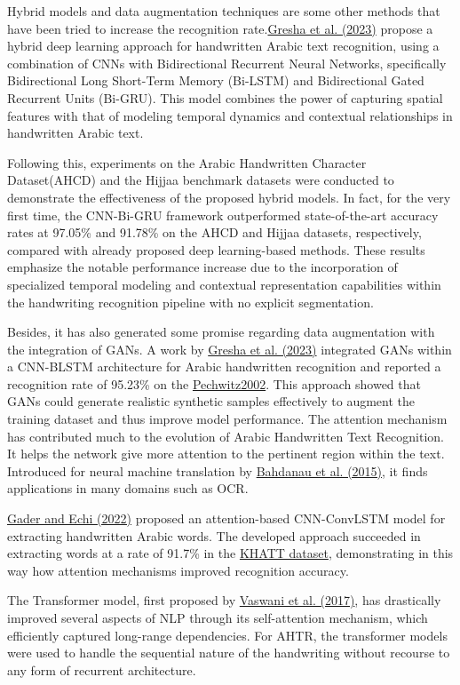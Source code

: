 Hybrid models and data augmentation techniques are some other methods that have been tried to increase the recognition rate.\hyperref[Gresha2023]{Gresha et al. (2023)} propose a hybrid deep learning approach for handwritten Arabic text recognition, using a combination of CNNs with Bidirectional Recurrent Neural Networks, specifically Bidirectional Long Short-Term Memory (Bi-LSTM) and Bidirectional Gated Recurrent Units (Bi-GRU). This model combines the power of capturing spatial features with that of modeling temporal dynamics and contextual relationships in handwritten Arabic text.

Following this, experiments on the Arabic Handwritten Character Dataset(AHCD)  and the Hijjaa benchmark datasets were conducted to demonstrate the effectiveness of the proposed hybrid models. In fact, for the very first time, the CNN-Bi-GRU framework outperformed state-of-the-art accuracy rates at 97.05\% and 91.78\% on the AHCD and Hijjaa datasets, respectively, compared with already proposed deep learning-based methods. These results emphasize the notable performance increase due to the incorporation of specialized temporal modeling and contextual representation capabilities within the handwriting recognition pipeline with no explicit segmentation.

Besides, it has also generated some promise regarding data augmentation with the integration of GANs. A work by \hyperref[Gresha2023]{Gresha et al. (2023)} integrated GANs within a CNN-BLSTM architecture for Arabic handwritten recognition and reported a recognition rate of 95.23\% on the \hyperref[Pechwitz2002]{Pechwitz2002}. This approach showed that GANs could generate realistic synthetic samples effectively to augment the training dataset and thus improve model performance.
The attention mechanism has contributed much to the evolution of Arabic Handwritten Text Recognition. It helps the network give more attention to the pertinent region within the text. Introduced for neural machine translation by \hyperref[Bahdanau2015]{Bahdanau et al. (2015)}, it finds applications in many domains such as OCR.

\hyperref[Gader2022]{Gader and Echi (2022)} proposed an attention-based CNN-ConvLSTM model for extracting handwritten Arabic words. The developed approach succeeded in extracting words at a rate of 91.7\% in the \hyperref[Khatt2016]{KHATT dataset}, demonstrating in this way how attention mechanisms improved recognition accuracy.


The Transformer model, first proposed by \hyperref[Vaswani2017]{Vaswani et al. (2017)}, has drastically improved several aspects of NLP through its self-attention mechanism, which efficiently captured long-range dependencies. For AHTR, the transformer models were used to handle the sequential nature of the handwriting without recourse to any form of recurrent architecture.


